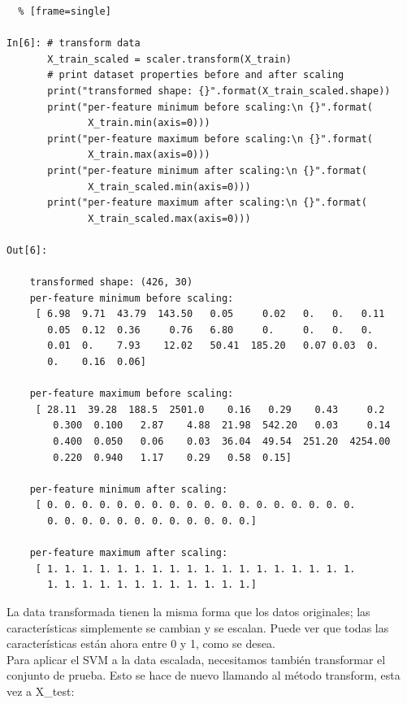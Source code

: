 \begin{lstlisting}  % [frame=single]

In[6]: # transform data
       X_train_scaled = scaler.transform(X_train)
       # print dataset properties before and after scaling
       print("transformed shape: {}".format(X_train_scaled.shape))
       print("per-feature minimum before scaling:\n {}".format(
              X_train.min(axis=0)))
       print("per-feature maximum before scaling:\n {}".format(
              X_train.max(axis=0)))
       print("per-feature minimum after scaling:\n {}".format(
              X_train_scaled.min(axis=0)))
       print("per-feature maximum after scaling:\n {}".format(
              X_train_scaled.max(axis=0)))

Out[6]:

    transformed shape: (426, 30)
    per-feature minimum before scaling:
     [ 6.98  9.71  43.79  143.50   0.05     0.02   0.   0.   0.11
       0.05  0.12  0.36     0.76   6.80     0.     0.   0.   0.
       0.01  0.    7.93    12.02   50.41  185.20   0.07 0.03  0.
       0.    0.16  0.06]

    per-feature maximum before scaling:
     [ 28.11  39.28  188.5  2501.0    0.16   0.29    0.43     0.2
        0.300  0.100   2.87    4.88  21.98  542.20   0.03     0.14
        0.400  0.050   0.06    0.03  36.04  49.54  251.20  4254.00
        0.220  0.940   1.17    0.29   0.58  0.15]
     
    per-feature minimum after scaling:
     [ 0. 0. 0. 0. 0. 0. 0. 0. 0. 0. 0. 0. 0. 0. 0. 0. 0. 0.
       0. 0. 0. 0. 0. 0. 0. 0. 0. 0. 0. 0.]
    
    per-feature maximum after scaling:
     [ 1. 1. 1. 1. 1. 1. 1. 1. 1. 1. 1. 1. 1. 1. 1. 1. 1. 1.
       1. 1. 1. 1. 1. 1. 1. 1. 1. 1. 1. 1.]

\end{lstlisting}


La data transformada tienen la misma forma que los datos originales; las características simplemente se cambian y se escalan. Puede ver que todas las características están ahora entre 0 y 1, como se desea. \\


Para aplicar el SVM a la data escalada,  necesitamos también  transformar el conjunto de prueba.
Esto se hace de nuevo llamando al método  {\ttfamily transform}, esta vez a { \ttfamily X\_test}:


